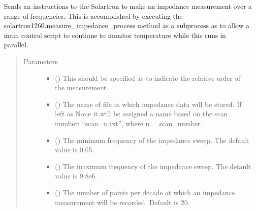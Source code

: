 \documentclass[letterpaper,10pt,english]{sphinxmanual}
\begin{document}
\begin{fulllineitems}
\begin{fulllineitems}
\label{\detokenize{vtipy_docs/vtipy:vtipy.impedance.solartron1260.measure_impedance}}
Sends an instructions to the Solartron to make an impedance measurement
over a range of frequencies. This is accomplished by executing the
solartron1260.measure\_impedance\_process method as a subprocess as to
allow a main control script to continue to monitor temperature while
this runs in parallel.
\begin{quote}\begin{description}
\item[{Parameters}] \leavevmode\begin{itemize}
\item {} 
 (\sphinxstyleliteralemphasis{\sphinxupquote{, }}) \textendash{} This should be specified as to indicate the relative order of the
measurement.

\item {} 
 (\sphinxstyleliteralemphasis{\sphinxupquote{, }}) \textendash{} The name of file in which impedance data will be
stored. If left as None it will be assigned a name based on the
scan number: “scan\_n.txt”, where n = scan\_number.

\item {} 
 (\sphinxstyleliteralemphasis{\sphinxupquote{, }}) \textendash{} The minimum frequency of the impedance sweep. The default value
is 0.05.

\item {} 
 (\sphinxstyleliteralemphasis{\sphinxupquote{, }}) \textendash{} The maximum frequency of the impedance sweep. The default value
is 9.8e6.

\item {} 
 (\sphinxstyleliteralemphasis{\sphinxupquote{, }}) \textendash{} The number of points per decade at which an impedance measurement
will be recorded. Default is 20.


\end{itemize}
\end{description}
\end{quote}
\end{fulllineitems}
\end{fulllineitems}
\end{document}
